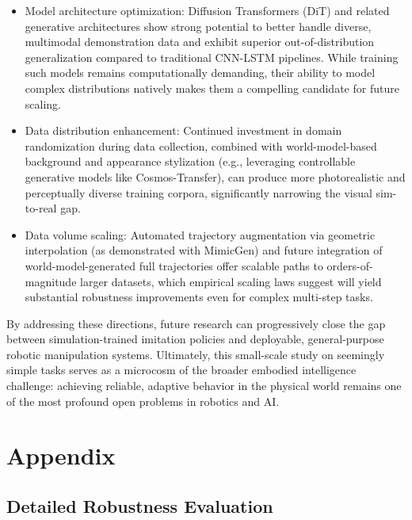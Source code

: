 \documentclass{article} %
\begin{document}
\begin{minipage}{\linewidth}
\begin{itemize}
\item Model architecture optimization: Diffusion Transformers (DiT) and related generative architectures show strong potential to better handle diverse, multimodal demonstration data and exhibit superior out-of-distribution generalization compared to traditional CNN-LSTM pipelines. While training such models remains computationally demanding, their ability to model complex distributions natively makes them a compelling candidate for future scaling.
\item Data distribution enhancement: Continued investment in domain randomization during data collection, combined with world-model-based background and appearance stylization (e.g., leveraging controllable generative models like Cosmos-Transfer), can produce more photorealistic and perceptually diverse training corpora, significantly narrowing the visual sim-to-real gap.
\item Data volume scaling: Automated trajectory augmentation via geometric interpolation (as demonstrated with MimicGen) and future integration of world-model-generated full trajectories offer scalable paths to orders-of-magnitude larger datasets, which empirical scaling laws suggest will yield substantial robustness improvements even for complex multi-step tasks.
\end{itemize}
\end{minipage}

By addressing these directions, future research can progressively close the gap between simulation-trained imitation policies and deployable, general-purpose robotic manipulation systems. Ultimately, this small-scale study on seemingly simple tasks serves as a microcosm of the broader embodied intelligence challenge: achieving reliable, adaptive behavior in the physical world remains one of the most profound open problems in robotics and AI.





\appendix
\section{Appendix}

\subsection{Detailed Robustness Evaluation}
\label{app:robustness}
\end{document}
